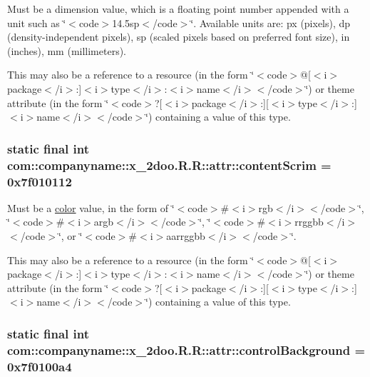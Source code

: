 Must be a dimension value, which is a floating point number appended with a unit such as \char`\"{}$<$code$>$14.5sp$<$/code$>$\char`\"{}. Available units are: px (pixels), dp (density-independent pixels), sp (scaled pixels based on preferred font size), in (inches), mm (millimeters). 

This may also be a reference to a resource (in the form \char`\"{}$<$code$>$@\mbox{[}$<$i$>$package$<$/i$>$:\mbox{]}$<$i$>$type$<$/i$>$:$<$i$>$name$<$/i$>$$<$/code$>$\char`\"{}) or theme attribute (in the form \char`\"{}$<$code$>$?\mbox{[}$<$i$>$package$<$/i$>$:\mbox{]}\mbox{[}$<$i$>$type$<$/i$>$:\mbox{]}$<$i$>$name$<$/i$>$$<$/code$>$\char`\"{}) containing a value of this type. \hypertarget{classcom_1_1companyname_1_1x__2doo_1_1_r_1_1attr_e4754d34ad709f02c62ccf9c0aad2861}{
\subsubsection[{contentScrim}]{\setlength{\rightskip}{0pt plus 5cm}static final int com::companyname::x\_\-2doo.R.R::attr::contentScrim = 0x7f010112}}
\label{classcom_1_1companyname_1_1x__2doo_1_1_r_1_1attr_e4754d34ad709f02c62ccf9c0aad2861}


Must be a \hyperlink{classcom_1_1companyname_1_1x__2doo_1_1_r_1_1color}{color} value, in the form of \char`\"{}$<$code$>$\#$<$i$>$rgb$<$/i$>$$<$/code$>$\char`\"{}, \char`\"{}$<$code$>$\#$<$i$>$argb$<$/i$>$$<$/code$>$\char`\"{}, \char`\"{}$<$code$>$\#$<$i$>$rrggbb$<$/i$>$$<$/code$>$\char`\"{}, or \char`\"{}$<$code$>$\#$<$i$>$aarrggbb$<$/i$>$$<$/code$>$\char`\"{}. 

This may also be a reference to a resource (in the form \char`\"{}$<$code$>$@\mbox{[}$<$i$>$package$<$/i$>$:\mbox{]}$<$i$>$type$<$/i$>$:$<$i$>$name$<$/i$>$$<$/code$>$\char`\"{}) or theme attribute (in the form \char`\"{}$<$code$>$?\mbox{[}$<$i$>$package$<$/i$>$:\mbox{]}\mbox{[}$<$i$>$type$<$/i$>$:\mbox{]}$<$i$>$name$<$/i$>$$<$/code$>$\char`\"{}) containing a value of this type. \hypertarget{classcom_1_1companyname_1_1x__2doo_1_1_r_1_1attr_8dcdd9a8cd023897d5588b69ab7a60f3}{
\subsubsection[{controlBackground}]{\setlength{\rightskip}{0pt plus 5cm}static final int com::companyname::x\_\-2doo.R.R::attr::controlBackground = 0x7f0100a4}}
\label{classcom_1_1companyname_1_1x__2doo_1_1_r_1_1attr_8dcdd9a8cd023897d5588b69ab7a60f3}


